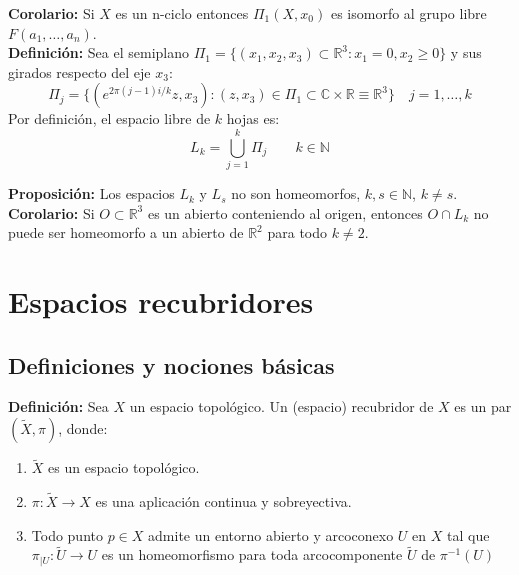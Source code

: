 \documentclass{article}
\begin{document}
\textbf{Corolario:} Si $X$ es un n-ciclo entonces $\Pi_1(X,x_0)$ es isomorfo al grupo libre $F(a_1,\ldots,a_n)$. \\

\textbf{Definición:} Sea el semiplano $\Pi_1=\{(x_1,x_2,x_3)\subset \mathbb{R}^3:x_1=0,x_2\geq 0\}$ y sus girados respecto del eje $x_3$:
\begin{equation*}
\Pi_j=\{\left(e^{2\pi(j-1)i/k}z,x_3\right):(z,x_3)\in \Pi_1\subset \mathbb{C}\times \mathbb{R}\equiv \mathbb{R}^3\}\quad j=1,\ldots,k
\end{equation*}
Por definición, el espacio libre de $k$ hojas es:
\begin{equation*}
L_k=\bigcup_{j=1}^k\Pi_j\qquad k\in\mathbb{N}
\end{equation*}

\textbf{Proposición:} Los espacios $L_k$ y $L_s$ no son homeomorfos, $k,s\in \mathbb{N}$, $k\neq s$.\\

\textbf{Corolario:} Si $O\subset \mathbb{R}^3$ es un abierto conteniendo al origen, entonces $O\cap L_k$ no puede ser homeomorfo a un abierto de $\mathbb{R}^2$ para todo $k\neq 2$.

\section{Espacios recubridores}
\subsection{Definiciones y nociones básicas}
\textbf{Definición:} Sea $X$ un espacio topológico. Un (espacio) recubridor de $X$ es un par $(\tilde{X},\pi)$, donde:
\begin{enumerate}
\item $\tilde{X}$ es un espacio topológico.

\item $\pi:\tilde{X}\rightarrow X$ es una aplicación continua y sobreyectiva.

\item Todo punto $p\in X$ admite un entorno abierto y arcoconexo $U$ en $X$ tal que $\pi_{|U}:\tilde{U}\rightarrow U$ es un homeomorfismo para toda arcocomponente $\tilde{U}$ de $\pi^{-1}(U)$
\end{enumerate}
\end{document}

